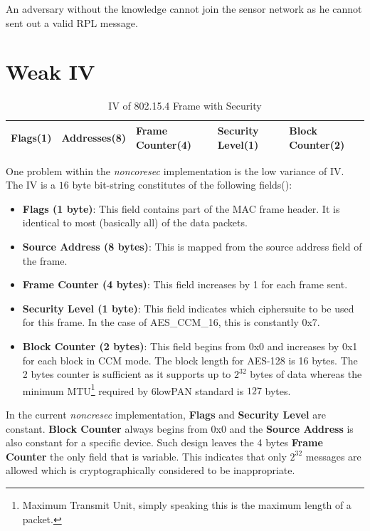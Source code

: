 An adversary without the knowledge cannot join the sensor network as he cannot sent out a valid RPL message.

\section{Weak IV}

\begin{table}
\centering
\begin{tabular}{| l | l | l | l | l |}
\hline
Flags(1) & Addresses(8) & Frame Counter(4) & Security Level(1) & Block Counter(2)       \\ \hline
\end{tabular}
\caption{IV of 802.15.4 Frame with Security} \label{Tbl: 802154 Frame}
\end{table}

One problem within the {\it noncoresec} implementation is the low variance of IV. The IV is a $16$ byte bit-string constitutes of the following fields():
\begin{itemize}
\item {\bf Flags (1 byte)}: This field contains part of the MAC frame header. It is identical to most (basically all) of the data packets.

\item{\bf Source Address (8 bytes)}: This is mapped from the source address field of the frame.

\item{\bf Frame Counter (4 bytes)}: This field increases by 1 for each frame sent.

\item{\bf Security Level (1 byte)}: This field indicates which ciphersuite to be used for this frame. In the case of AES\_CCM\_16, this is constantly 0x7.

\item{\bf Block Counter (2 bytes)}: This field begins from 0x0 and increases by 0x1 for each block in CCM mode. The block length for AES-128 is 16 bytes. The 2 bytes counter is sufficient as it supports up to $2^{32}$ bytes of data whereas the minimum MTU\footnote{Maximum Transmit Unit, simply speaking this is the maximum length of a packet.} required by 6lowPAN standard\cite{rfc4944} is $127$ bytes.
\end{itemize}

In the current {\it noncresec} implementation, \textbf{Flags} and \textbf{Security Level} are constant. \textbf{Block Counter} always begins from 0x0 and the \textbf{Source Address} is also constant for a specific device. Such design leaves the 4 bytes \textbf{Frame Counter} the only field that is variable. This indicates that only $2^32$ messages are allowed which is cryptographically considered to be inappropriate.

